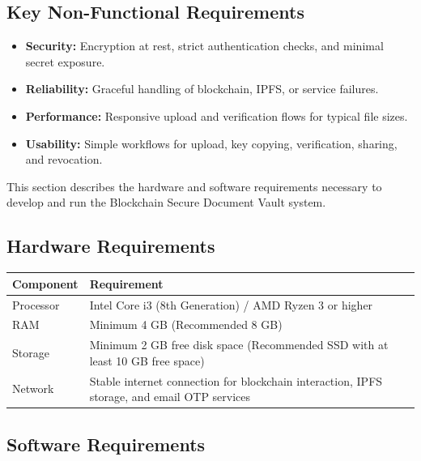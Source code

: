 \documentclass[12pt]{article}
\begin{document}
\subsection{Key Non-Functional Requirements}

\begin{itemize}
\item \textbf{Security:} Encryption at rest, strict authentication checks, and minimal secret exposure.
\item \textbf{Reliability:} Graceful handling of blockchain, IPFS, or service failures.
\item \textbf{Performance:} Responsive upload and verification flows for typical file sizes.
\item \textbf{Usability:} Simple workflows for upload, key copying, verification, sharing, and revocation.
\end{itemize}

This section describes the hardware and software requirements necessary to develop and run the Blockchain Secure Document Vault system.

\subsection{Hardware Requirements}

\begin{center}
\begin{tabular}{|l|p{10cm}|}
\hline
\textbf{Component} & \textbf{Requirement} \\
\hline
Processor & Intel Core i3 (8th Generation) / AMD Ryzen 3 or higher \\
\hline
RAM & Minimum 4 GB (Recommended 8 GB) \\
\hline
Storage & Minimum 2 GB free disk space (Recommended SSD with at least 10 GB free space) \\
\hline
Network & Stable internet connection for blockchain interaction, IPFS storage, and email OTP services \\
\hline
\end{tabular}
\end{center}

\subsection{Software Requirements}
\end{document}
